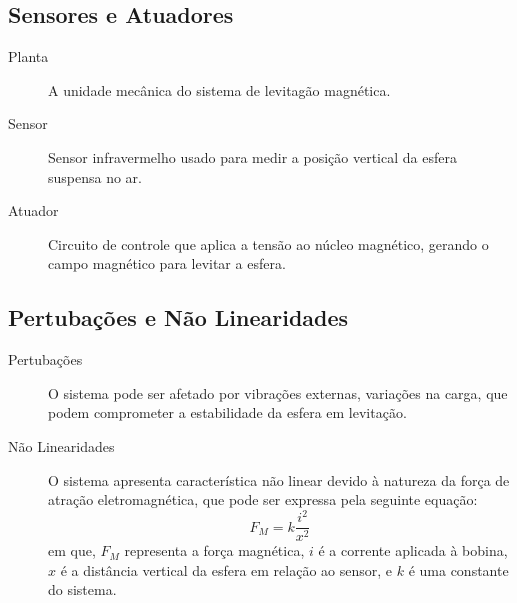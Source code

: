 \subsection{Sensores e Atuadores}
\begin{description}
    \item[Planta] A unidade mecânica do sistema de levitagão magnética.
    \item[Sensor] Sensor infravermelho usado para medir a posição vertical da esfera suspensa no ar.
    \item[Atuador] Circuito de controle que aplica a tensão ao núcleo magnético, gerando o campo magnético para levitar a esfera. 
\end{description}

\subsection{Pertubações e Não Linearidades}
\begin{description}
    \item[Pertubações] O sistema pode ser afetado por vibrações externas, variações na carga, que podem comprometer a estabilidade da esfera em levitação.
    \item[Não Linearidades] O sistema apresenta característica não linear devido à natureza da força de atração eletromagnética, que pode ser expressa pela seguinte equação: 
    \begin{equation}
        F_{M} = k \frac{i^{2}}{x^{2}}
        \label{eq: forca_magnetica}
    \end{equation}
    em que, $F_{M}$ representa a força magnética, $i$ é a corrente aplicada à bobina, $x$ é a distância vertical da esfera em relação ao sensor, e $k$ é uma constante do sistema.
\end{description}